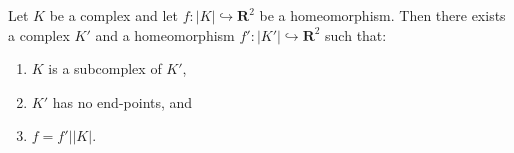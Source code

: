 Let $K$ be a complex and let $f: |K| \hookrightarrow \mathbf{R}^2$ be a homeomorphism. Then there exists a complex $K'$ and a homeomorphism $f': |K'| \hookrightarrow \mathbf{R}^2$ such that:
\begin{enumerate}
\item $K$ is a subcomplex of $K'$,
\item $K'$ has no end-points, and
\item $f = f' \big| |K|$.
\end{enumerate}
